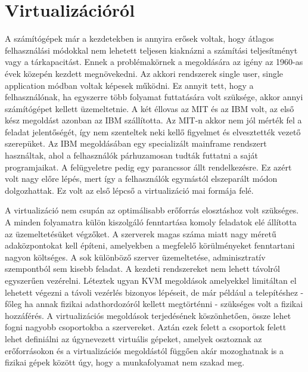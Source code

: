 \documentclass[12pt,oneside,justify,table]{book}
\begin{document}
 




\tableofcontents

\chapter{Virtualizációról}

A számítógépek már a kezdetekben is annyira erősek voltak, hogy átlagos felhasználási módokkal nem lehetett teljesen kiaknázni a számítási teljesítményt vagy a tárkapacitást.
Ennek a problémakörnek a megoldására az igény az 1960-as évek közepén kezdett megnövekedni. 
Az akkori rendszerek single user, single application módban voltak képesek működni. 
Ez annyit tett, hogy a felhasználónak, ha egyszerre több folyamat futtatására volt szüksége, akkor annyi számítógépet kellett üzemeltetnie. 
A két éllovas az MIT és az IBM volt, az első kész megoldást azonban az IBM szállította. 
Az MIT-n akkor nem jól mérték fel a feladat jelentőségét, így nem szenteltek neki kellő figyelmet és elvesztették vezető szerepüket. 
Az IBM megoldásában egy specializált mainframe rendszert használtak, ahol a felhasználók párhuzamosan tudták futtatni a saját programjaikat.
A felügyeletre pedig egy parancssor állt rendelkezésre.
Ez azért volt nagy előre lépés, mert így a felhasználók egymástól elszeparált módon dolgozhattak.
Ez volt az első lépcső a virtualizáció mai formája felé.

A virtualizáció nem csupán az optimálisabb erőforrás elosztáshoz volt szükséges. 
A minden folyamatra külön kiszolgáló fenntartása komoly feladatok elé állította az üzemeltetésüket végzőket. 
A szerverek magas száma miatt nagy méretű adaközpontokat kell építeni, amelyekben a megfelelő körülményeket fenntartani nagyon költséges. 
A sok különböző szerver üzemeltetése, adminisztratív szempontból sem kisebb feladat. 
A kezdeti rendszereket nem lehett távolról egyszerűen vezérelni. Léteztek ugyan KVM megoldások amelyekkel limitáltan el lehetett végezni a távoli vezérlés bizonyos lépéseit, de már például a telepítéshez - főleg ha annak fizikai adathordozóról kellett megtörténni - szükséges volt a fizikai hozzáférés. 
A virtualizációs megoldások terjedésének köszönhetően, össze lehet fogni nagyobb csoportokba a szervereket. 
Aztán ezek felett a csoportok felett lehet definiálni az úgynevezett virtuális gépeket, amelyek osztoznak az erőforrásokon és a virtualizációs megoldástól függően akár mozoghatnak is a fizikai gépek között úgy, hogy a munkafolyamat nem szakad meg.
\end{document}

